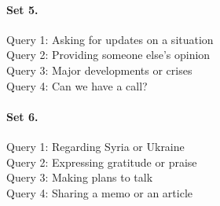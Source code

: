 \documentclass{article}
\begin{document}
\paragraph{Set 5.}
Query 1: Asking for updates on a situation \\
Query 2: Providing someone else’s opinion \\
Query 3: Major developments or crises \\
Query 4: Can we have a call?

\paragraph{Set 6.}
Query 1: Regarding Syria or Ukraine \\
Query 2: Expressing gratitude or praise \\
Query 3: Making plans to talk \\
Query 4: Sharing a memo or an article

\end{document}
